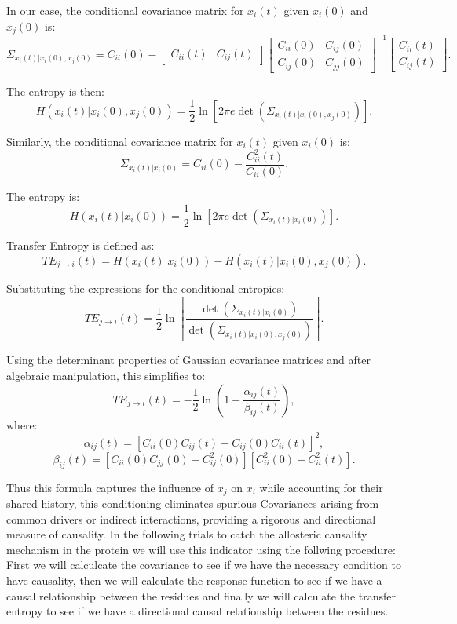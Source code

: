 \documentclass[English, Lau, oneside]{sapthesis}
\begin{document}
In our case, the conditional covariance matrix for \(x_i(t)\) given \(x_i(0)\) and \(x_j(0)\) is:
\[
\Sigma_{x_i(t) | x_i(0), x_j(0)} = C_{ii}(0) - \begin{bmatrix}
C_{ii}(t) & C_{ij}(t)
\end{bmatrix}
\begin{bmatrix}
C_{ii}(0) & C_{ij}(0) \\
C_{ij}(0) & C_{jj}(0)
\end{bmatrix}^{-1}
\begin{bmatrix}
C_{ii}(t) \\
C_{ij}(t)
\end{bmatrix}.
\]

The entropy is then:
\[
H(x_i(t) | x_i(0), x_j(0)) = \frac{1}{2} \ln{[2\pi e \det\left(\Sigma_{x_i(t) | x_i(0), x_j(0)}\right)]}.
\]

Similarly, the conditional covariance matrix for \(x_i(t)\) given \(x_i(0)\) is:
\[
\Sigma_{x_i(t) | x_i(0)} = C_{ii}(0) - \frac{C_{ii}^2(t)}{C_{ii}(0)}.
\]

The entropy is:
\[
H(x_i(t) | x_i(0)) = \frac{1}{2} \ln{[2\pi e \det\left(\Sigma_{x_i(t) | x_i(0)}\right)]}.
\]


Transfer Entropy is defined as:
\[
TE_{j \to i}(t) = H(x_i(t) | x_i(0)) - H(x_i(t) | x_i(0), x_j(0)).
\]

Substituting the expressions for the conditional entropies:
\[
TE_{j \to i}(t) = \frac{1}{2} \ln{[\frac{\det{(\Sigma_{x_i(t) | x_i(0)})}}{\det{(\Sigma_{x_i(t) | x_i(0), x_j(0)})}}]}.
\]

Using the determinant properties of Gaussian covariance matrices and after algebraic manipulation, this simplifies to:
\[
TE_{j \to i}(t) = -\frac{1}{2} \ln {(1 - \frac{\alpha_{ij}(t)}{\beta_{ij}(t)})},
\]
where:
\[
\alpha_{ij}(t) = \left[C_{ii}(0)C_{ij}(t) - C_{ij}(0)C_{ii}(t)\right]^2,
\]
\[
\beta_{ij}(t) = \left[C_{ii}(0)C_{jj}(0) - C_{ij}^2(0)\right]\left[C_{ii}^2(0) - C_{ii}^2(t)\right].
\]

Thus this formula captures the influence of \(x_j\) on \(x_i\) while accounting for their shared history, this conditioning eliminates spurious Covariances arising from common drivers or indirect interactions,
providing a rigorous and directional measure of causality.
In the following trials to catch the allosteric causality mechanism in the protein we will use this indicator using the follwing procedure:\\
First we will calculcate the covariance to see if we have the necessary condition to have causality, then we will calculate the response function to see if we have a causal relationship between the residues and finally we will calculate the transfer entropy to see if we have a directional causal relationship between the residues.\\
\newpage
\end{document}

